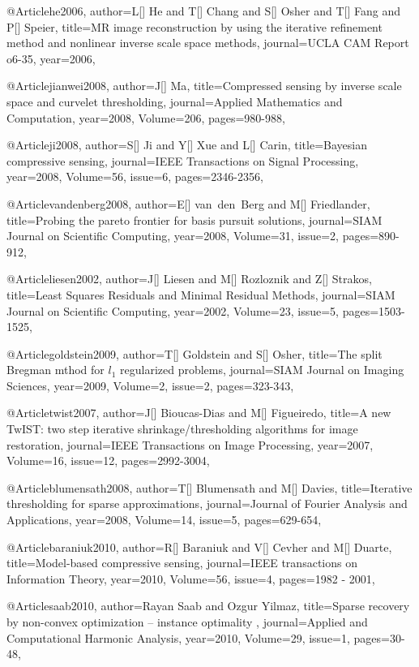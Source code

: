 @Article{he2006,
  author={L[] He and T[] Chang and S[] Osher and T[] Fang and P[] Speier},
  title={MR image reconstruction by using the iterative refinement method and nonlinear inverse scale space methods},
  journal={UCLA CAM Report o6-35},
  year=2006,
}

@Article{jianwei2008,
  author={J[] Ma},
  title={Compressed sensing by inverse scale space and curvelet thresholding},
  journal={Applied Mathematics and Computation},
  year=2008,
  Volume=206,
  pages={980-988},
}

@Article{ji2008,
  author={S[] Ji and Y[] Xue and L[] Carin},
  title={Bayesian compressive sensing},
  journal={IEEE Transactions on Signal Processing},
  year=2008,
  Volume=56,
  issue=6,
  pages={2346-2356},
}

@Article{vandenberg2008,
  author={E[] van~den~Berg and M[] Friedlander},
  title={Probing the pareto frontier for basis pursuit solutions},
  journal={SIAM Journal on Scientific Computing},
  year=2008,
  Volume=31,
  issue=2,
  pages={890-912},
}

@Article{liesen2002,
  author={J[] Liesen and M[] Rozloznik and Z[] Strakos},
  title={Least Squares Residuals and Minimal Residual Methods},
  journal={SIAM Journal on Scientific Computing},
  year=2002,
  Volume=23,
  issue=5,
  pages={1503-1525},
}

@Article{goldstein2009,
  author={T[] Goldstein and S[] Osher},
  title={The split Bregman mthod for $l_1$ regularized problems},
  journal={SIAM Journal on Imaging Sciences},
  year=2009,
  Volume=2,
  issue=2,
  pages={323-343},
}



@Article{twist2007,
  author={J[] Bioucas-Dias and M[] Figueiredo},
  title={A new TwIST: two step iterative shrinkage/thresholding algorithms for image restoration},
  journal={IEEE Transactions on Image Processing},
  year=2007,
  Volume=16,
  issue=12,
  pages={2992-3004},
}

@Article{blumensath2008,
  author={T[] Blumensath and M[] Davies},
  title={Iterative thresholding for sparse approximations},
  journal={Journal of {F}ourier Analysis and Applications},
  year=2008,
  Volume=14,
  issue=5,
  pages={629-654},
}

@Article{baraniuk2010,
  author={R[] Baraniuk and V[] Cevher and M[] Duarte},
  title={Model-based compressive sensing},
  journal={IEEE transactions on Information Theory},
  year=2010,
  Volume=56,
  issue=4,
  pages={1982 - 2001},
}

@Article{saab2010,
  author={Rayan Saab and Ozgur Yilmaz},
  title={Sparse recovery by non-convex optimization – instance optimality },
  journal={Applied and Computational Harmonic Analysis},
  year=2010,
  Volume=29,
  issue=1,
  pages={30-48},
}

